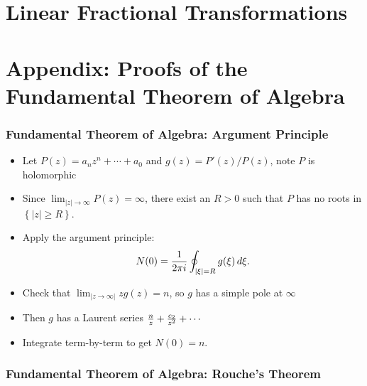 \hypertarget{linear-fractional-transformations}{%
\section{Linear Fractional
Transformations}\label{linear-fractional-transformations}}

\hypertarget{appendix-proofs-of-the-fundamental-theorem-of-algebra}{%
\section{Appendix: Proofs of the Fundamental Theorem of
Algebra}\label{appendix-proofs-of-the-fundamental-theorem-of-algebra}}

\hypertarget{fundamental-theorem-of-algebra-argument-principle}{%
\subsubsection{Fundamental Theorem of Algebra: Argument
Principle}\label{fundamental-theorem-of-algebra-argument-principle}}

\begin{itemize}
\tightlist
\item
  Let \(P(z) = a_nz^n + \cdots + a_0\) and \(g(z) = P'(z)/P(z)\), note
  \(P\) is holomorphic
\item
  Since
  \(\lim_{{\left\lvert {z} \right\rvert} \to \infty} P(z) = \infty\),
  there exist an \(R>0\) such that \(P\) has no roots in
  \(\left\{{{\left\lvert {z} \right\rvert} \geq R}\right\}\).
\item
  Apply the argument principle:
  \begin{align*}     N(0) = {1\over 2\pi i} \oint_{{\left\lvert {\xi} \right\rvert} = R} g(\xi) \,d\xi     .\end{align*}
\item
  Check that
  \(\lim_{{\left\lvert {z\to \infty} \right\rvert}}zg(z) = n\), so \(g\)
  has a simple pole at \(\infty\)
\item
  Then \(g\) has a Laurent series
  \({n\over z} + {c_2 \over z^2} + \cdots\)
\item
  Integrate term-by-term to get \(N(0) = n\).
\end{itemize}

\hypertarget{fundamental-theorem-of-algebra-rouches-theorem}{%
\subsubsection{Fundamental Theorem of Algebra: Rouche's
Theorem}\label{fundamental-theorem-of-algebra-rouches-theorem}}

